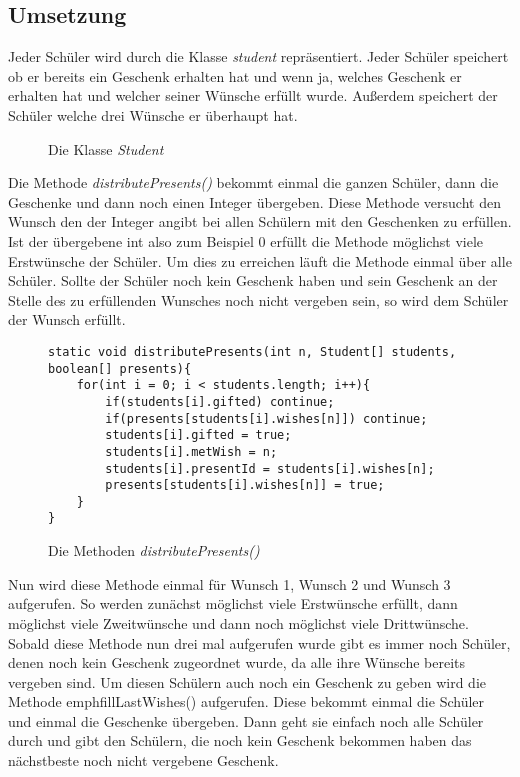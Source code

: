 \documentclass[a4paper, 12pt]{scrartcl}
\begin{document}
\subsection{Umsetzung}

Jeder Schüler wird durch die Klasse \emph{student} repräsentiert. Jeder Schüler speichert ob er bereits ein Geschenk erhalten hat und wenn ja, welches Geschenk er erhalten hat und welcher seiner Wünsche erfüllt wurde. Außerdem speichert der Schüler welche drei Wünsche er überhaupt hat.

\begin{figure}[H]
    \centering
    \caption{Die Klasse \emph{Student}}
\end{figure}

Die Methode \emph{distributePresents()} bekommt einmal die ganzen Schüler, dann die Geschenke und dann noch einen Integer übergeben. Diese Methode versucht den Wunsch den der Integer angibt bei allen Schülern mit den Geschenken zu erfüllen. Ist der übergebene int also zum Beispiel 0 erfüllt die Methode möglichst viele Erstwünsche der Schüler. Um dies zu erreichen läuft die Methode einmal über alle Schüler. Sollte der Schüler noch kein Geschenk haben und sein Geschenk an der Stelle des zu erfüllenden Wunsches noch nicht vergeben sein, so wird dem Schüler der Wunsch erfüllt.

\begin{figure}[H]
\centering
\begin{lstlisting}
static void distributePresents(int n, Student[] students, boolean[] presents){
    for(int i = 0; i < students.length; i++){
        if(students[i].gifted) continue;
        if(presents[students[i].wishes[n]]) continue;
        students[i].gifted = true;
        students[i].metWish = n;
        students[i].presentId = students[i].wishes[n];
        presents[students[i].wishes[n]] = true;
    }
}  
\end{lstlisting}
\caption{Die Methoden \emph{distributePresents()}}
\end{figure}

Nun wird diese Methode einmal für Wunsch 1, Wunsch 2 und Wunsch 3 aufgerufen. So werden zunächst möglichst viele Erstwünsche erfüllt, dann möglichst viele Zweitwünsche und dann noch möglichst viele Drittwünsche. Sobald diese Methode nun drei mal aufgerufen wurde gibt es immer noch Schüler, denen noch kein Geschenk zugeordnet wurde, da alle ihre Wünsche bereits vergeben sind. Um diesen Schülern auch noch ein Geschenk zu geben wird die Methode emph{fillLastWishes()} aufgerufen. Diese bekommt einmal die Schüler und einmal die Geschenke übergeben. Dann geht sie einfach noch alle Schüler durch und gibt den Schülern, die noch kein Geschenk bekommen haben das nächstbeste noch nicht vergebene Geschenk.
\end{document}
